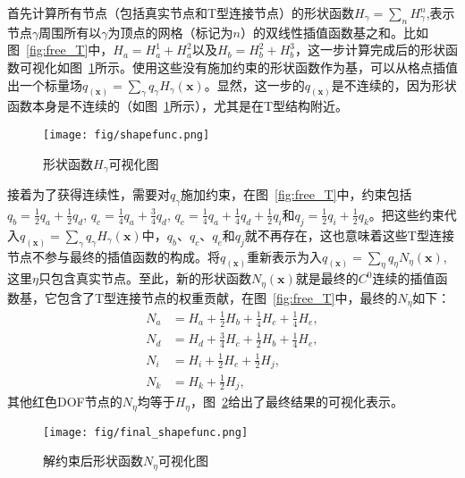首先计算所有节点（包括真实节点和T型连接节点）的形状函数$H_{\gamma}=\sum_nH_{\gamma}^n$,表示节点$\gamma$周围所有以$\gamma$为顶点的网格（标记为$n$）的双线性插值函数基之和。比如图~\ref{fig:free_T}中，$H_a=H_a^1+H_a^2$以及$H_b=H_b^2+H_b^3$，这一步计算完成后的形状函数可视化如图~\ref{fig:shapefunc}所示。使用这些没有施加约束的形状函数作为基，可以从格点插值出一个标量场$q_(\mathbf{x})=\sum_{\gamma} q_{\gamma}H_{\gamma}(\mathbf{x})$。显然，这一步的$q_(\mathbf{x})$是不连续的，因为形状函数本身是不连续的（如图~\ref{fig:shapefunc}所示），尤其是在T型结构附近。

\begin{figure}[H]
    \centering
    \texttt{[image: fig/shapefunc.png]}
    \caption{形状函数$H_{\gamma}$可视化图}
    \label{fig:shapefunc}
\end{figure}

接着为了获得连续性，需要对$q_{\gamma}$施加约束，在图~\ref{fig:free_T}中，约束包括$q_b=\frac{1}{2}q_a+\frac{1}{2}q_d$, $ q_c=\frac{1}{4}q_a+\frac{3}{4}q_d$, $q_e=\frac{1}{4}q_a+\frac{1}{4}q_d+\frac{1}{2}q_i$和$q_j=\frac{1}{2}q_i+\frac{1}{2}q_k$。把这些约束代入$q_(\mathbf{x})=\sum_{\gamma} q_{\gamma}H_{\gamma}(\mathbf{x})$中，$q_b$、$q_c$、$q_e$和$q_j$就不再存在，这也意味着这些T型连接节点不参与最终的插值函数的构成。将$q_(\mathbf{x})$重新表示为入$q_(\mathbf{x})=\sum_{\eta} q_{\eta}N_{\eta}(\mathbf{x})$,这里$\eta$只包含真实节点。至此，新的形状函数$N_{\eta}(\mathbf{x})$就是最终的$C^0$连续的插值函数基，它包含了T型连接节点的权重贡献，在图~\ref{fig:free_T}中，最终的$N_{\eta}$如下：
\begin{equation}
    \begin{aligned}
        N_a &= H_a + \frac{1}{2}H_b + \frac{1}{4}H_c + \frac{1}{4}H_e,\\
        N_d &= H_d + \frac{3}{4}H_c + \frac{1}{2}H_b + \frac{1}{4}H_e,\\
        N_i &= H_i + \frac{1}{2}H_e + \frac{1}{2}H_j,\\
        N_k &= H_k + \frac{1}{2}H_j,
    \end{aligned}
\end{equation}
其他红色DOF节点的$N_{\eta}$均等于$H_{\eta}$，图~\ref{fig:finalShapefunc}给出了最终结果的可视化表示。

\begin{figure}[H]
    \centering
    \texttt{[image: fig/final\_shapefunc.png]}
    \caption{解约束后形状函数$N_{\eta}$可视化图}
    \label{fig:finalShapefunc}
\end{figure}

